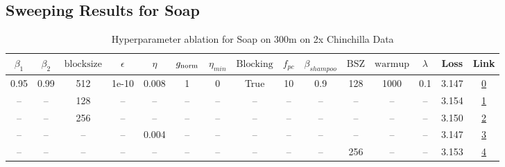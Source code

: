 \subsection{Sweeping Results for Soap}%
\begin{table}[H]
\centering
\caption{Hyperparameter ablation for Soap on 300m on 2x Chinchilla Data}
\label{tab:ablation_soap_300m_on_2x_chinchilla_data}
\begin{tabular}{ccccccccccccccc}
\toprule
$\beta_1$ & $\beta_2$ & $\mathrm{block size}$ & $\epsilon$ & $\eta$ & $g_{\mathrm{norm}}$ & $\eta_{min}$ & $\mathrm{Blocking}$ & $f_{pc}$ & $\beta_{shampoo}$ & $\mathrm{BSZ}$ & $\mathrm{warmup}$ & $\lambda$ & Loss & Link \\
\midrule
0.95 & 0.99 & 512 & 1e-10 & 0.008 & 1 & 0 & True & 10 & 0.9 & 128 & 1000 & 0.1 & 3.147 & \href{https://wandb.ai/marin-community/optimizer-scaling/runs/sweep-300m-12B-soapefe4b166lr0.008-wd0.1-minlr0-warmup1000-b10.9-cebb81}{0} \\
\midrule
-- & -- & 128 & -- & -- & -- & -- & -- & -- & -- & -- & -- & -- & 3.154 & \href{https://wandb.ai/marin-community/optimizer-scaling/runs/sweep-300m-12B-soapeb93333lr0.008-wd0.1-minlr0-warmup1000-b10.95-feb227}{1} \\
-- & -- & 256 & -- & -- & -- & -- & -- & -- & -- & -- & -- & -- & 3.150 & \href{https://wandb.ai/marin-community/optimizer-scaling/runs/sweep-300m-12B-soape1f2d4flr0.008-wd0.1-minlr0-warmup1000-b10.95-78cbf5}{2} \\
-- & -- & -- & -- & 0.004 & -- & -- & -- & -- & -- & -- & -- & -- & 3.147 & \href{https://wandb.ai/marin-community/optimizer-scaling/runs/sweep-300m-12B-soapef97cdfclr0.004-wd0.1-minlr0-warmup1000-b10.9-dec1d6}{3} \\
-- & -- & -- & -- & -- & -- & -- & -- & -- & -- & 256 & -- & -- & 3.153 & \href{https://wandb.ai/marin-community/optimizer-scaling/runs/sweep-300m-12B-soape63ad3blr0.008-wd0.1-minlr0-warmup1000-b10.95-b1cbe1}{4} \\
\bottomrule
\end{tabular}
\end{table}

